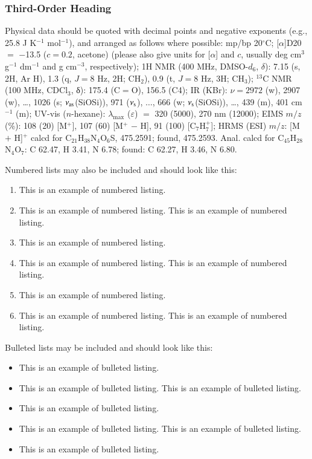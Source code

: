 \documentclass{aip-cp}
\begin{document}
\subsubsection{Third-Order Heading}
Physical data should be quoted with decimal points and negative exponents (e.g., 25.8 J K$^{-1}$ mol$^{-1}$), and arranged as follows where possible: mp/bp 20$^{\circ}$C; [$\alpha$]D20 $=$ $-$13.5 ($c = 0.2$, acetone) (please also give units for [$\alpha$] and $c$, usually deg cm$^3$ g$^{-1}$ dm$^{-1}$ and g cm$^{-3}$, respectively); 1H NMR (400 MHz, DMSO-$d_6$, $\delta$): 7.15 (s, 2H, Ar H), 1.3 (q, $J = 8$ Hz, 2H; CH$_2$), 0.9 (t, $J = 8$ Hz, 3H; CH$_3$); $^{13}$C NMR (100 MHz, CDCl$_3$, δ): 175.4 (C$=$O), 156.5 (C4); IR (KBr): $\nu = 2972$ (w), 2907 (w), \ldots, 1026 (s; $\nu_{\rm as}$(SiOSi)), 971 ($\nu_{\rm s}$), $\ldots$, 666 (w; $\nu_{\rm s}$(SiOSi)), \ldots, 439 (m), 401 cm$^{-1}$ (m); UV-vis ($n$-hexane): $\lambda_{\max}$ ($\varepsilon$) $=$ 320 (5000), 270 nm (12000); EIMS $m/z$ (\%): 108 (20) [M$^+$], 107 (60) [M$^+$ $-$ H], 91 (100) [C$_7$H$_7^+$]; HRMS (ESI) $m/z$: [M $+$ H]$^+$ calcd for C$_{21}$H$_{38}$N$_{4}$O$_{6}$S, 475.2591; found, 475.2593. Anal. calcd for C$_{45}$H$_{28}$N$_{4}$O$_{7}$: C 62.47, H 3.41, N 6.78; found: C 62.27, H 3.46, N 6.80.

\noindent Numbered lists may also be included and should look like this:

\begin{enumerate}
\item This is an example of numbered listing.
\item This is an example of numbered listing. This is an example of numbered listing.
\item This is an example of numbered listing.
\item This is an example of numbered listing. This is an example of numbered listing.
\item This is an example of numbered listing.
\item This is an example of numbered listing. This is an example of numbered listing.
\end{enumerate}

\noindent Bulleted lists may be included and should look like this:

\begin{itemize}
\item This is an example of bulleted listing.
\item This is an example of bulleted listing. This is an example of bulleted listing.
\item This is an example of bulleted listing.
\item This is an example of bulleted listing. This is an example of bulleted listing.
\item This is an example of bulleted listing.
\end{itemize}
\end{document}
